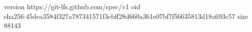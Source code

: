 version https://git-lfs.github.com/spec/v1
oid sha256:45dea3584f327a787341571f3ebff28d660a361e07bf7f56635813d18a693c57
size 88143
